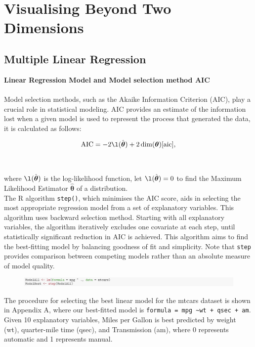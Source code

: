 \documentclass{article}\usepackage[]{graphicx}\usepackage[]{xcolor}
\numberwithin{equation}{section}
\begin{document}
{\newpage

\section{Visualising Beyond Two Dimensions}

\subsection{Multiple Linear Regression}

\noindent
\textbf{Linear Regression Model and Model selection method AIC}
\\  
\noindent 
\\Model selection methods, such as the Akaike Information Criterion (AIC), play a crucial role in statistical modeling. AIC provides an estimate of the information lost when a given model is used to represent the process that generated the data, it is calculated as follows: 

$$\mathrm{AIC} = -2 \l(\hat{\boldsymbol {\theta}})+2 \dim (\boldsymbol{\theta}) \cite{aic},$$
\\  
\\where $\l(\hat{\boldsymbol{\theta}})$ is the log-likelihood function, let $\l(\hat{\boldsymbol{\theta}}) = 0$ to find the Maximum Likelihood Estimator $\hat{\boldsymbol{\theta}}$ of a distribution.\\

\noindent 
The R algorithm \texttt{step()}, which minimises the AIC score, aids in selecting the most appropriate regression model from a set of explanatory variables. This algorithm uses backward selection method. Starting with all explanatory variables, the algorithm iteratively excludes one covariate at each step, until statistically significant reduction in AIC is achieved. This algorithm aims to find the best-fitting model by balancing goodness of fit and simplicity. Note that \texttt{step} provides comparison between competing models rather than an absolute measure of model quality.

\begin{figure}[H]
    \centering
    \includegraphics[width=1\textwidth]{image_reference/codeshoot.png}
    \label{fig:codeshoot}
\end{figure}
\noindent
The procedure for selecting the best linear model for the mtcars dataset is shown in Appendix A, where our best-fitted model is \texttt{formula = mpg \textasciitilde wt + qsec + am}. Given 10 explanatory variables, Miles per Gallon is best predicted by weight (wt), quarter-mile time (qsec), and Transmission (am), where 0 represents automatic and 1 represents manual.


}
\end{document}
